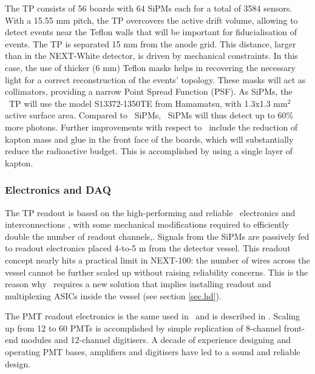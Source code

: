 The TP consists of 56 boards with 64 SiPMs each for a total of 3584 sensors. With a 15.55 mm pitch, the TP overcovers the active drift volume, allowing to detect events near the Teflon walls that will be important for fiducialisation of events.
The TP is separated 15 mm from the anode grid. This distance, larger than in the NEXT-White detector, is driven by mechanical constraints. In this case, the use of thicker (6 mm) Teflon masks helps in recovering the necessary light for a correct reconstruction of the events’ topology. These masks will act as collimators, providing a narrow Point Spread Function (PSF). As SiPMs, the \Next\ TP will use the model S13372-1350TE from Hamamatsu, with 1.3x1.3 mm$^2$ active surface area. Compared to \New\ SiPMs, \Next\ SiPMs will thus detect up to 60\% more photons.
Further improvements with respect to \NEW\ include the reduction of kapton mass and glue in the front face of the boards, which will substantially reduce the radioactive budget. This is accomplished by using a single layer of kapton.

\subsubsection{Electronics and DAQ}

The TP readout is based on the high-performing and reliable \NEW\ electronics and interconnections \cite{Rodriguez:2015a}, with some mechanical modifications required to efficiently double the number of readout channels,. Signals from the SiPMs are passively fed to readout electronics placed 4-to-5 m from the detector vessel. This readout concept nearly hits a practical limit in NEXT-100: the number of wires across the vessel cannot be further scaled up without raising reliability concerns. This is the reason why \NHD\  requires a new solution that implies installing readout and multiplexing ASICs inside the vessel (see section \ref{sec.hd}). %

\indent

The PMT readout electronics is the same  used in \NEW\ and is described in \cite{Alvarez:2019a}. Scaling up from 12 to 60 PMTs is accomplished by simple replication of 8-channel front-end modules and 12-channel digitisers. A decade of experience designing and operating PMT bases, amplifiers and digitisers have led to a sound and reliable design. %

